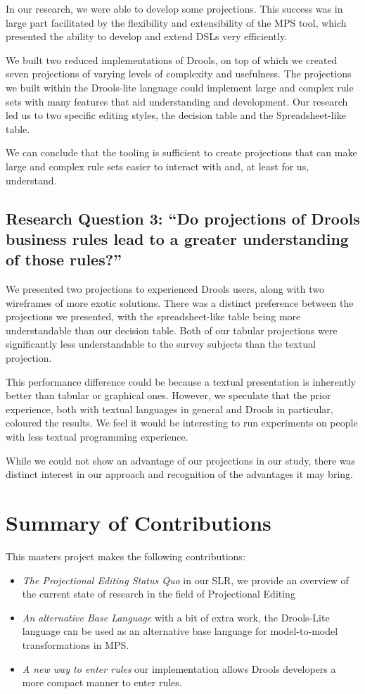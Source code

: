 In our research, we were able to develop some projections.  
This success was in large part facilitated by the flexibility and extensibility of the MPS tool, which presented the ability to develop and extend DSLs very efficiently.

We built two reduced implementations of Drools, on top of which we created seven projections of varying levels of complexity and usefulness.
The projections we built within the Drools-lite language could implement large and complex rule sets with many features that aid understanding and development.
Our research led us to two specific editing styles, the decision table and the Spreadsheet-like table.

We can conclude that the tooling is sufficient to create projections that can make large and complex rule sets easier to interact with and, at least for us, understand.

\subsection{Research Question 3: ``Do projections of Drools business rules lead to a greater understanding of those rules?''}

We presented two projections to experienced Drools users, along with two wireframes of more exotic solutions.
There was a distinct preference between the projections we presented, with the spreadsheet-like table being more understandable than our decision table.
Both of our tabular projections were significantly less understandable to the survey subjects than the textual projection.

This performance difference could be because a textual presentation is inherently better than tabular or graphical ones.
However, we speculate that the prior experience, both with textual languages in general and Drools in particular, coloured the results.
We feel it would be interesting to run experiments on people with less textual programming experience.

While we could not show an advantage of our projections in our study, there was distinct interest in our approach and recognition of the advantages it may bring.

\section{Summary of Contributions}

This masters project makes the following contributions:
\begin{itemize}
    \item \emph{The Projectional Editing Status Quo} in our SLR, we provide an overview of the current state of research in the field of Projectional Editing
    \item \emph{An alternative Base Language} with a bit of extra work, the Drools-Lite language can be used as an alternative base language for model-to-model transformations in MPS.
    \item \emph{A new way to enter rules} our implementation allows Drools developers a more compact manner to enter rules.
\end{itemize}

